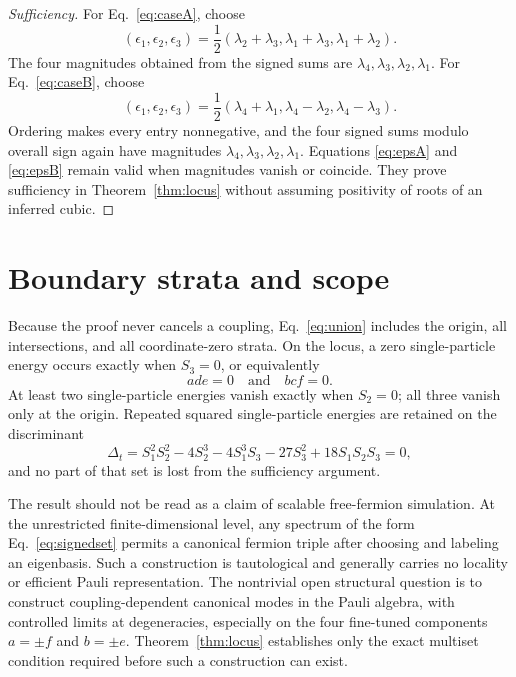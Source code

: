\documentclass[
  aps,
  pra,
  reprint,
  superscriptaddress,
  nofootinbib,
  longbibliography
]{revtex4-2}
\begin{document}
\begin{proof}[Sufficiency]
For Eq.~\eqref{eq:caseA}, choose
\begin{equation}
 (\epsilon_1,\epsilon_2,\epsilon_3)
 =\frac12(\lambda_2+\lambda_3,\lambda_1+\lambda_3,
 \lambda_1+\lambda_2).
 \label{eq:epsA}
\end{equation}
The four magnitudes obtained from the signed sums are
\(\lambda_4,\lambda_3,\lambda_2,\lambda_1\).  For Eq.~\eqref{eq:caseB}, choose
\begin{equation}
 (\epsilon_1,\epsilon_2,\epsilon_3)
 =\frac12(\lambda_4+\lambda_1,\lambda_4-\lambda_2,
 \lambda_4-\lambda_3).
 \label{eq:epsB}
\end{equation}
Ordering makes every entry nonnegative, and the four signed sums modulo overall sign
again have magnitudes \(\lambda_4,\lambda_3,\lambda_2,\lambda_1\).  Equations
\eqref{eq:epsA} and \eqref{eq:epsB} remain valid when magnitudes vanish or coincide.
They prove sufficiency in Theorem~\ref{thm:locus} without assuming positivity of roots
of an inferred cubic.
\end{proof}

\section{Boundary strata and scope}
\label{sec:boundaries}

Because the proof never cancels a coupling, Eq.~\eqref{eq:union} includes the origin,
all intersections, and all coordinate-zero strata.  On the locus, a zero
single-particle energy occurs exactly when \(S_3=0\), or equivalently
\begin{equation}
 ade=0\quad\text{and}\quad bcf=0.
 \label{eq:zeromode}
\end{equation}
At least two single-particle energies vanish exactly when \(S_2=0\); all three vanish
only at the origin.  Repeated squared single-particle energies are retained on the
discriminant
\begin{equation}
 \Delta_t=S_1^2S_2^2-4S_2^3-4S_1^3S_3-27S_3^2
 +18S_1S_2S_3=0,
 \label{eq:discriminant}
\end{equation}
and no part of that set is lost from the sufficiency argument.

The result should not be read as a claim of scalable free-fermion simulation.  At the
unrestricted finite-dimensional level, any spectrum of the form
Eq.~\eqref{eq:signedset} permits a canonical fermion triple after choosing and labeling
an eigenbasis.  Such a construction is tautological and generally carries no locality
or efficient Pauli representation.  The nontrivial open structural question is to
construct coupling-dependent canonical modes in the Pauli algebra, with controlled
limits at degeneracies, especially on the four fine-tuned components \(a=\pm f\) and
\(b=\pm e\).  Theorem~\ref{thm:locus} establishes only the exact multiset condition
required before such a construction can exist.
\end{document}
